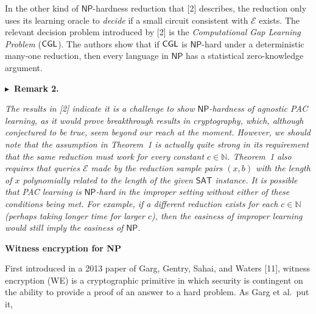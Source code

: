 In the other kind of ${\mathsf{NP}}$-hardness reduction that [2] describes, the reduction only uses its learning oracle to \emph{decide} if a small circuit consistent with $\mathcal{E}$ exists. The relevant decision problem introduced by [2] is the \emph{Computational Gap Learning Problem} (${\sf CGL}$). The authors show that if ${\sf CGL}$ is ${\mathsf{NP}}$-hard under a deterministic many-one reduction, then every language in ${\mathsf{NP}}$ has a statistical zero-knowledge argument.\par





\par\medskip\noindent\textbf{
$\blacktriangleright$ Remark 2.
}\par



\emph{The results in [2] indicate it is a challenge to show ${\mathsf{NP}}$-hardness of agnostic PAC learning, as it would prove breakthrough results in cryptography, which, although conjectured to be true, seem beyond our reach at the moment. However,
we should note that the assumption in Theorem 1 is actually quite strong in its requirement that the same reduction must work for every constant $c\in\mathbb{N}$. Theorem 1 also requires that queries $\mathcal{E}$ made by the reduction sample pairs $(x,b)$ with the length of $x$ polynomially related to the length of the given ${\mathsf{SAT}}$ instance. It is possible that PAC learning is ${\mathsf{NP}}$-hard in the improper setting without either of these conditions being met. For example, if a different reduction exists for each $c\in\mathbb{N}$ (perhaps taking longer time for larger $c$), then the easiness of improper learning would still imply the easiness of ${\mathsf{NP}}$.}\par







\par\medskip\noindent\textbf{Witness encryption for NP}\par




First introduced in a 2013 paper of Garg, Gentry, Sahai, and Waters [11], witness encryption (WE) is a cryptographic primitive in which security is contingent on the ability to provide a proof of an answer to a hard problem. As Garg et al. put it,\par



